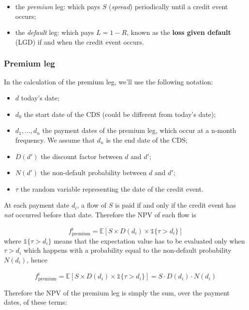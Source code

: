 \begin{itemize}
\tightlist
\item
  the \emph{premium} leg: which pays \(S\) (\emph{spread}) periodically until a credit event occurs;
\item
  the \emph{default} leg: which pays \(L = 1 - R\), known as the
  \textbf{loss given default} (LGD) if and when the credit event occurs.
\end{itemize}

\subsubsection{Premium leg}\label{premium-leg}

In the calculation of the premium leg, we'll use the following notation:

\begin{itemize}
\tightlist
\item
  \(d\) today's date;
\item
  \(d_0\) the start date of the CDS (could be different from today's date);
\item
  \(d_1, ..., d_n\) the payment dates of the premium leg, which occur at
  a n-month frequency. We assume that \(d_n\) is the end date of the CDS;
\item
  \(D(d')\) the discount factor between \(d\) and \(d'\);
\item
  \(N(d')\) the non-default probability between \(d\) and \(d'\);
\item
  \(\tau\) the random variable representing the date of the credit event.
\end{itemize}

At each payment date \(d_i\), a flow of \(S\) is paid if and only if the
credit event has \emph{not} occurred before that date. Therefore the NPV of
each flow is

\[
f_{\mathrm{premium}}^i = \mathbb{E}\left[ S \times D(d_i) \times \mathbb{1}\{\tau > d_i\} \right]
\]
where $\mathbb{1}\{\tau > d_i\}$ means that the expectation value has to be evaluated only when $\tau > d_i$ which happens with a probability equal to the non-default probability $N(d_i)$, hence 

\[
f_{\mathrm{premium}}^i = \mathbb{E}\left[ S \times D(d_i) \times \mathbb{1}\{\tau > d_i\} \right] = S \cdot D(d_i) \cdot N(d_i)
\]
 
Therefore the NPV of the premium leg is simply the sum, over the payment
dates, of these terms:

